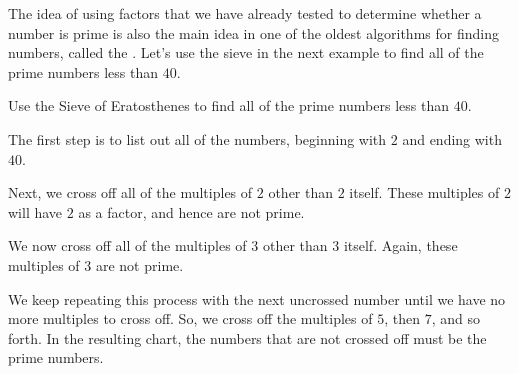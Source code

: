 \documentclass{ximera}
\begin{document}
The idea of using factors that we have already tested to determine whether a number is prime is also the main idea in one of the oldest algorithms for finding numbers, called the . Let's use the sieve in the next example to find all of the prime numbers less than $40$.

\begin{example}
Use the Sieve of Eratosthenes to find all of the prime numbers less than $40$.

The first step is to list out all of the numbers, beginning with $2$ and ending with $40$.

\begin{image}
\end{image}
Next, we cross off all of the multiples of $2$ other than $2$ itself. These multiples of $2$ will have $2$ as a factor, and hence are not prime.
\begin{image}
\end{image}
We now cross off all of the multiples of $3$ other than $3$ itself. Again, these multiples of $3$ are not prime.
\begin{image}
 \end{image}
We keep repeating this process with the next uncrossed number until we have no more multiples to cross off. So, we cross off the multiples of $5$, then $7$, and so forth. In the resulting chart, the numbers that are not crossed off must be the prime numbers.



\end{example}
\end{document}
